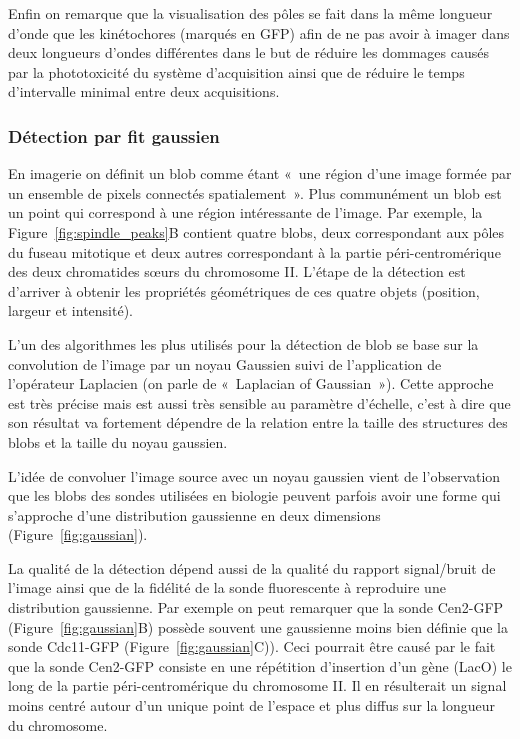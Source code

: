 \documentclass[12pt,a4paper,twoside,openright]{book}
\begin{document}
Enfin on remarque que la visualisation des pôles se fait dans la même
longueur d'onde que les kinétochores (marqués en GFP) afin de ne pas
avoir à imager dans deux longueurs d'ondes différentes dans le but de
réduire les dommages causés par la phototoxicité du système
d'acquisition ainsi que de réduire le temps d'intervalle minimal entre
deux acquisitions.

\subsubsection{Détection par fit
gaussien}\label{duxe9tection-par-fit-gaussien}

En imagerie on définit un blob comme étant «~une région d'une image
formée par un ensemble de pixels connectés spatialement~». Plus
communément un blob est un point qui correspond à une région
intéressante de l'image. Par exemple, la Figure~\ref{fig:spindle_peaks}B
contient quatre blobs, deux correspondant aux pôles du fuseau mitotique
et deux autres correspondant à la partie péri-centromérique des deux
chromatides sœurs du chromosome II. L'étape de la détection est
d'arriver à obtenir les propriétés géométriques de ces quatre objets
(position, largeur et intensité).

L'un des algorithmes les plus utilisés pour la détection de blob se base
sur la convolution de l'image par un noyau Gaussien suivi de
l'application de l'opérateur Laplacien (on parle de «~Laplacian of
Gaussian~»). Cette approche est très précise mais est aussi très
sensible au paramètre d'échelle, c'est à dire que son résultat va
fortement dépendre de la relation entre la taille des structures des
blobs et la taille du noyau gaussien.

L'idée de convoluer l'image source avec un noyau gaussien vient de
l'observation que les blobs des sondes utilisées en biologie peuvent
parfois avoir une forme qui s'approche d'une distribution gaussienne en
deux dimensions (Figure~\ref{fig:gaussian}).

La qualité de la détection dépend aussi de la qualité du rapport
signal/bruit de l'image ainsi que de la fidélité de la sonde
fluorescente à reproduire une distribution gaussienne. Par exemple on
peut remarquer que la sonde Cen2-GFP (Figure~\ref{fig:gaussian}B)
possède souvent une gaussienne moins bien définie que la sonde Cdc11-GFP
(Figure~\ref{fig:gaussian}C)). Ceci pourrait être causé par le fait que
la sonde Cen2-GFP consiste en une répétition d'insertion d'un gène
(LacO) le long de la partie péri-centromérique du chromosome II. Il en
résulterait un signal moins centré autour d'un unique point de l'espace
et plus diffus sur la longueur du chromosome.
\end{document}
